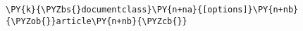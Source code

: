 \begin{Verbatim}[commandchars=\\\{\}]
\PY{k}{\PYZbs{}documentclass}\PY{n+na}{[options]}\PY{n+nb}{\PYZob{}}article\PY{n+nb}{\PYZcb{}}
\end{Verbatim}
